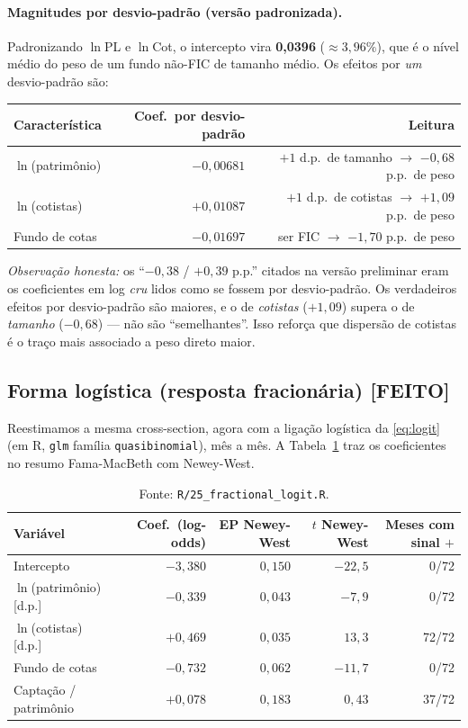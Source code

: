 \documentclass[11pt,a4paper]{article}
\newcommand{\feito}{\textcolor{feitog}{\textbf{[FEITO]}}}
\begin{document}
\paragraph{Magnitudes por desvio-padrão (versão padronizada).} Padronizando $\ln$PL e $\ln$Cot,
o intercepto vira \textbf{0,0396} ($\approx3{,}96\%$), que é o nível médio do peso de um fundo
não-FIC de tamanho médio. Os efeitos por \emph{um} desvio-padrão são:
\begin{center}\small
\begin{tabular}{@{}lrr@{}}
\toprule
Característica & Coef.\ por desvio-padrão & Leitura \\
\midrule
$\ln$(patrimônio) & $-0{,}00681$ & $+1$ d.p.\ de tamanho $\to$ $-0{,}68$ p.p.\ de peso \\
$\ln$(cotistas)   & $+0{,}01087$ & $+1$ d.p.\ de cotistas $\to$ $+1{,}09$ p.p.\ de peso \\
Fundo de cotas    & $-0{,}01697$ & ser FIC $\to$ $-1{,}70$ p.p.\ de peso \\
\bottomrule
\end{tabular}
\end{center}
\emph{Observação honesta:} os ``$-0{,}38$ / $+0{,}39$ p.p.'' citados na versão preliminar eram os
coeficientes em log \emph{cru} lidos como se fossem por desvio-padrão. Os verdadeiros efeitos por
desvio-padrão são maiores, e o de \emph{cotistas} ($+1{,}09$) supera o de \emph{tamanho}
($-0{,}68$) --- não são ``semelhantes''. Isso reforça que dispersão de cotistas é o traço mais
associado a peso direto maior.

\subsection{Forma logística (resposta fracionária) \feito}
Reestimamos a mesma cross-section, agora com a ligação logística da \eqref{eq:logit} (em R,
\texttt{glm} família \texttt{quasibinomial}), mês a mês. A Tabela~\ref{tab:logit} traz os
coeficientes no resumo Fama-MacBeth com Newey-West.

\begin{table}[h]\centering\small
\caption{Cross-section logística (resposta fracionária), Fama-MacBeth + Newey-West. Coeficientes
na escala de \emph{log-odds}; características de escala padronizadas.}
\label{tab:logit}
\begin{tabular}{@{}lrrrr@{}}
\toprule
Variável & Coef.\ (log-odds) & EP Newey-West & $t$ Newey-West & Meses com sinal $+$ \\
\midrule
Intercepto              & $-3{,}380$ & $0{,}150$ & $-22{,}5$ & 0/72 \\
$\ln$(patrimônio) [d.p.]& $-0{,}339$ & $0{,}043$ & $-7{,}9$  & 0/72 \\
$\ln$(cotistas) [d.p.]  & $+0{,}469$ & $0{,}035$ & $13{,}3$  & 72/72 \\
Fundo de cotas          & $-0{,}732$ & $0{,}062$ & $-11{,}7$ & 0/72 \\
Captação / patrimônio   & $+0{,}078$ & $0{,}183$ & $0{,}43$  & 37/72 \\
\bottomrule
\end{tabular}
\caption*{\footnotesize Fonte: \texttt{R/25\_fractional\_logit.R}.}
\end{table}
\end{document}
